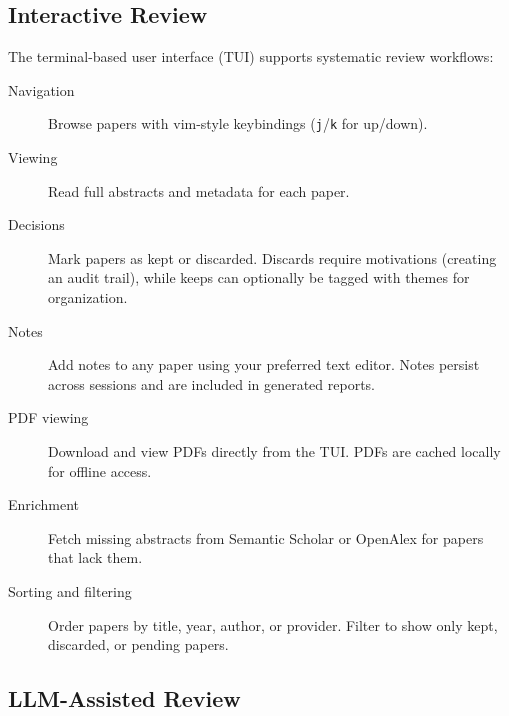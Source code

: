 \subsection{Interactive Review}

The terminal-based user interface (TUI) supports systematic review workflows:
\begin{description}
\item[Navigation] Browse papers with vim-style keybindings (\texttt{j}/\texttt{k} 
  for up/down).
\item[Viewing] Read full abstracts and metadata for each paper.
\item[Decisions] Mark papers as kept or discarded.
  Discards require motivations (creating an audit trail), while keeps can 
  optionally be tagged with themes for organization.
\item[Notes] Add notes to any paper using your preferred text editor.
  Notes persist across sessions and are included in generated reports.
\item[PDF viewing] Download and view PDFs directly from the TUI.
  PDFs are cached locally for offline access.
\item[Enrichment] Fetch missing abstracts from Semantic Scholar or OpenAlex 
  for papers that lack them.
\item[Sorting and filtering] Order papers by title, year, author, or provider.
  Filter to show only kept, discarded, or pending papers.
\end{description}

\subsection{LLM-Assisted Review}

